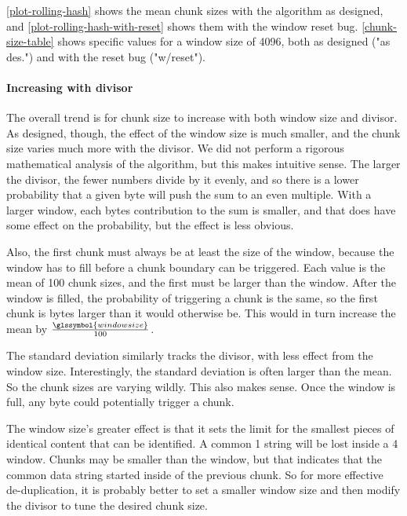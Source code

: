 \autoref{plot-rolling-hash} shows the mean chunk sizes with the algorithm as
designed, and \autoref{plot-rolling-hash-with-reset} shows them with the window
reset bug. \autoref{chunk-size-table} shows specific values for a window size of
4096, both as designed ("as des.") and with the reset bug ("w/reset").

\paragraph{Increasing with divisor}

The overall trend is for chunk size to increase with both window size and
divisor. As designed, though, the effect of the window size is much smaller, and
the chunk size varies much more with the divisor. We did not perform a rigorous
mathematical analysis of the algorithm, but this makes intuitive sense. The
larger the divisor, the fewer numbers divide by it evenly, and so there is a
lower probability that a given byte will push the sum to an even multiple. With
a larger window, each bytes contribution to the sum is smaller, and that does
have some effect on the probability, but the effect is less obvious.

Also, the first chunk must always be at least the size of the window, because
the window has to fill before a chunk boundary can be triggered. Each value is
the mean of 100 chunk sizes, and the first must be larger than the window. After
the window is filled, the probability of triggering a chunk is the same, so the
first chunk is  bytes larger than it would otherwise be.
This would in turn increase the mean by $\frac{\glssymbol{windowsize}}{100}$.

The standard deviation similarly tracks the divisor, with less effect from the
window size. Interestingly, the standard deviation is often larger than the
mean. So the chunk sizes are varying wildly. This also makes sense. Once the
window is full, any byte could potentially trigger a chunk.

The window size's greater effect is that it sets the limit for the smallest
pieces of identical content that can be identified. A common \SI{1}{\kib} string
will be lost inside a \SI{4}{\kib} window. Chunks may be smaller than the
window, but that indicates that the common data string started inside of the
previous chunk. So for more effective de-duplication, it is probably better to
set a smaller window size and then modify the divisor to tune the desired chunk
size.




